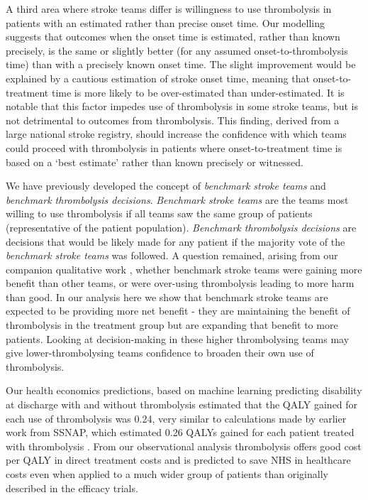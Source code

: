 A third area where stroke teams differ is willingness to use thrombolysis in patients with an estimated rather than precise onset time. Our modelling suggests that outcomes when the onset time is estimated, rather than known precisely, is the same or slightly better (for any assumed onset-to-thrombolysis time) than with a precisely known onset time. The slight improvement would be explained by a cautious estimation of stroke onset time, meaning that onset-to-treatment time is more likely to be over-estimated than under-estimated. It is notable that this factor impedes use of thrombolysis in some stroke teams, but is not detrimental to outcomes from thrombolysis. This finding, derived from a large national stroke registry, should increase the confidence with which teams could proceed with thrombolysis in patients where onset-to-treatment time is based on a `best estimate' rather than known precisely or witnessed.

We have previously developed the concept of \textit{benchmark stroke teams} and \textit{benchmark thrombolysis decisions}. \textit{Benchmark stroke teams} are the teams most willing to use thrombolysis if all teams saw the same group of patients (representative of the patient population). \textit{Benchmark thrombolysis decisions} are decisions that would be likely made for any patient if the majority vote of the \textit{benchmark stroke teams} was followed. A question remained, arising from our companion qualitative work \cite{jarvie_stroke_2024}, whether benchmark stroke teams were gaining more benefit than other teams, or were over-using thrombolysis leading to more harm than good. In our analysis here we show that benchmark stroke teams are expected to be providing more net benefit - they are maintaining the benefit of thrombolysis in the treatment group but are expanding that benefit to more patients. Looking at decision-making in these higher thrombolysing teams may give lower-thrombolysing teams confidence to broaden their own use of thrombolysis.

Our health economics predictions, based on machine learning predicting disability at discharge with and without thrombolysis estimated that the QALY gained for each use of thrombolysis was 0.24, very similar to calculations made by earlier work from SSNAP, which estimated 0.26 QALYs gained for each patient treated with thrombolysis \cite{sentinel_stroke_national_audit_programme_cost_2016}. From our observational analysis thrombolysis offers good cost per QALY in direct treatment costs and is predicted to save NHS in healthcare costs even when applied to a much wider group of patients than originally described in the efficacy trials.

